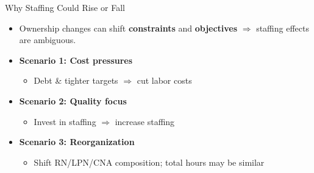 \documentclass{beamer}
\begin{document}
\begin{frame}[t]{Why Staffing Could Rise or Fall}

\begin{itemize}
	\setlength{\itemsep}{0.8em}
	\item Ownership changes can shift \textbf{constraints} and \textbf{objectives} $\Rightarrow$ staffing effects are 		ambiguous.
	\vspace{0.20em}

	\item \textbf{Scenario 1: Cost pressures}
	\begin{itemize}
		\setlength{\itemsep}{0.2em}
		\item Debt \& tighter targets $\Rightarrow$ cut labor costs
	\end{itemize}
	\vspace{0.10em}

	\item \textbf{Scenario 2: Quality focus}
	\begin{itemize}
		\setlength{\itemsep}{0.2em}
		\item Invest in staffing $\Rightarrow$ increase staffing
	\end{itemize}
	\vspace{0.10em}

	\item \textbf{Scenario 3: Reorganization}
	\begin{itemize}
		\setlength{\itemsep}{0.2em}
		\item Shift RN/LPN/CNA composition; total hours may be similar
	\end{itemize}

\end{itemize}
\end{frame}
\end{document}
